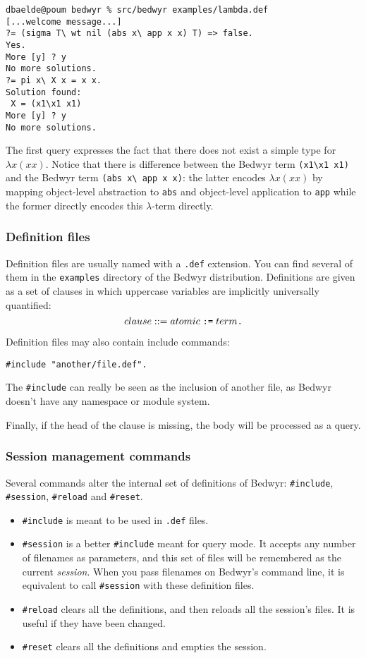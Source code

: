 \documentclass{article}
\begin{document}
\begin{verbatim}
dbaelde@poum bedwyr % src/bedwyr examples/lambda.def
[...welcome message...]
?= (sigma T\ wt nil (abs x\ app x x) T) => false.
Yes.
More [y] ? y
No more solutions.
?= pi x\ X x = x x.
Solution found:
 X = (x1\x1 x1)
More [y] ? y
No more solutions.
\end{verbatim}
The first query expresses the fact that there does not exist a simple
type for $\lambda x (x x)$.  Notice that there is difference between
the Bedwyr term \verb+(x1\x1 x1)+ and the Bedwyr term
\verb+(abs x\ app x x)+: the latter encodes $\lambda x (x x)$ by
mapping object-level abstraction to {\tt abs} and object-level
application to {\tt app} while the former directly encodes this
$\lambda$-term directly.


\subsubsection{Definition files}

Definition files are usually named with a \verb|.def| extension.
You can find several of them in the \verb.examples. directory
of the Bedwyr distribution.
Definitions are given as a set of clauses in which uppercase
variables are implicitly universally quantified:
\[ clause ::= atomic \;\verb.:=.\; term \verb|.| \]

Definition files may also contain include commands:
\begin{verbatim}#include "another/file.def".\end{verbatim}
The \verb.#include. can really be seen as the inclusion of another file,
as Bedwyr doesn't have any namespace or module system.

Finally, if the head of the clause is missing, the body will be processed as a 
query.

\subsubsection{Session management commands}

Several commands alter the internal set of definitions of Bedwyr:
\verb.#include., \verb.#session., \verb.#reload. and \verb.#reset..
\begin{itemize}
  \item
    \verb.#include. is meant to be used in \verb;.def; files.
  \item
    \verb.#session. is a better \verb.#include. meant for query mode.
    It accepts any number of filenames as parameters, and this set of files
    will be remembered as the current \emph{session}.
    When you pass filenames on Bedwyr's command line,
    it is equivalent to call \verb.#session. with these definition files.
  \item
    \verb.#reload. clears all the definitions,
    and then reloads all the session's files. It is useful if they have 
    been changed.
  \item
    \verb.#reset. clears all the definitions and empties the session.
\end{itemize}
\end{document}
